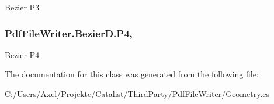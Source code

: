 Bezier P3 

\subsubsection[{\texorpdfstring{P4}{P4}}]{ Pdf\+File\+Writer.\+Bezier\+D.\+P4\hspace{0.3cm}{\ttfamily [get]}, {\ttfamily [set]}}\hypertarget{class_pdf_file_writer_1_1_bezier_d_a7e4ba1d387a6f241715c69a5ca78e574}{}\label{class_pdf_file_writer_1_1_bezier_d_a7e4ba1d387a6f241715c69a5ca78e574}


Bezier P4 



The documentation for this class was generated from the following file\+:\begin{DoxyCompactItemize}
\item 
C\+:/\+Users/\+Axel/\+Projekte/\+Catalist/\+Third\+Party/\+Pdf\+File\+Writer/Geometry.\+cs\end{DoxyCompactItemize}
